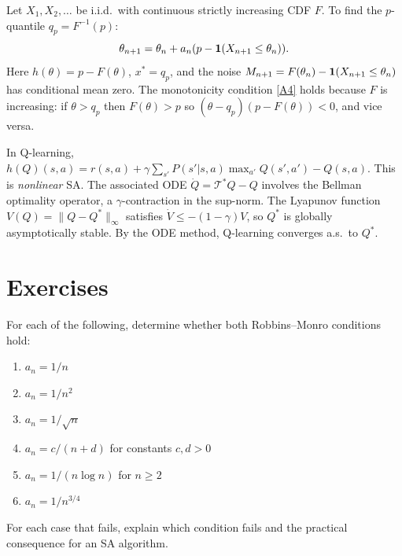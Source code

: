 \documentclass[11pt,a4paper]{article}
\begin{document}
\begin{example}
\label{ex:quantile}
Let $X_1, X_2, \ldots$ be i.i.d.\ with continuous strictly
increasing CDF $F$. To find the $p$-quantile $q_p = F^{-1}(p)$:
\[
  \theta_{n+1} = \theta_n + a_n(p - \mathbf{1}(X_{n+1} \leq \theta_n)).
\]
Here $h(\theta) = p - F(\theta)$, $x^* = q_p$, and the noise
$M_{n+1} = F(\theta_n) - \mathbf{1}(X_{n+1} \leq \theta_n)$ has
conditional mean zero. The monotonicity condition \ref{A4} holds
because $F$ is increasing: if $\theta > q_p$ then $F(\theta) > p$
so $(\theta - q_p)(p - F(\theta)) < 0$, and vice versa.
\end{example}

\begin{example}
\label{ex:q-learning-sa}
In Q-learning, $h(Q)(s,a) = r(s,a) + \gamma\sum_{s'}P(s'|s,a)
\max_{a'}Q(s',a') - Q(s,a)$. This is \emph{nonlinear} SA. The
associated ODE $\dot{Q} = \mathcal{T}^*Q - Q$ involves the Bellman
optimality operator, a $\gamma$-contraction in the sup-norm. The
Lyapunov function $V(Q) = \|Q - Q^*\|_\infty$ satisfies
$\dot{V} \leq -(1-\gamma)V$, so $Q^*$ is globally asymptotically
stable. By the ODE method, Q-learning converges a.s.\ to $Q^*$.
\end{example}


\section{Exercises}
\label{sec:exercises}

\begin{exercise}
\label{ex:step-sizes}
For each of the following, determine whether both Robbins--Monro
conditions hold:
\begin{enumerate}[label=(\alph*)]
  \item $a_n = 1/n$
  \item $a_n = 1/n^2$
  \item $a_n = 1/\sqrt{n}$
  \item $a_n = c/(n+d)$ for constants $c,d > 0$
  \item $a_n = 1/(n \log n)$ for $n \geq 2$
  \item $a_n = 1/n^{3/4}$
\end{enumerate}
For each case that fails, explain which condition fails and the
practical consequence for an SA algorithm.
\end{exercise}
\end{document}
